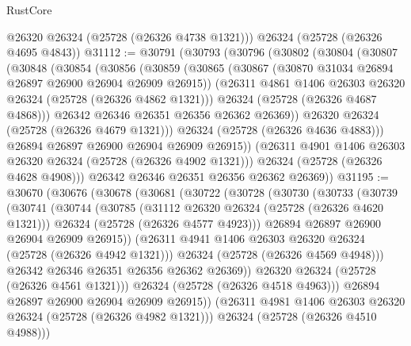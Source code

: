 \begin{lexlean}{RustCore}
\begin{coremodule}
      @26320
      @26324
      (@25728 (@26326 @4738 @1321)))
    @26324
    (@25728 (@26326 @4695 @4843))
@31112 := @30791
    (@30793
      (@30796
        (@30802
          (@30804
            (@30807
              (@30848
                (@30854
                  (@30856
                    (@30859
                      (@30865
                        (@30867 (@30870 @31034 @26894 @26897 @26900 @26904 @26909 @26915))
                        (@26311 @4861 @1406 @26303 @26320 @26324 (@25728 (@26326 @4862 @1321)))
                        @26324
                        (@25728 (@26326 @4687 @4868)))
                      @26342
                      @26346
                      @26351
                      @26356
                      @26362
                      @26369))
                  @26320
                  @26324
                  (@25728 (@26326 @4679 @1321)))
                @26324
                (@25728 (@26326 @4636 @4883)))
              @26894
              @26897
              @26900
              @26904
              @26909
              @26915))
          (@26311 @4901 @1406 @26303 @26320 @26324 (@25728 (@26326 @4902 @1321)))
          @26324
          (@25728 (@26326 @4628 @4908)))
        @26342
        @26346
        @26351
        @26356
        @26362
        @26369))
@31195 := @30670
    (@30676
      (@30678
        (@30681
          (@30722
            (@30728
              (@30730
                (@30733
                  (@30739
                    (@30741
                      (@30744
                        (@30785
                          (@31112 @26320 @26324 (@25728 (@26326 @4620 @1321)))
                          @26324
                          (@25728 (@26326 @4577 @4923)))
                        @26894
                        @26897
                        @26900
                        @26904
                        @26909
                        @26915))
                    (@26311 @4941 @1406 @26303 @26320 @26324 (@25728 (@26326 @4942 @1321)))
                    @26324
                    (@25728 (@26326 @4569 @4948)))
                  @26342
                  @26346
                  @26351
                  @26356
                  @26362
                  @26369))
              @26320
              @26324
              (@25728 (@26326 @4561 @1321)))
            @26324
            (@25728 (@26326 @4518 @4963)))
          @26894
          @26897
          @26900
          @26904
          @26909
          @26915))
      (@26311 @4981 @1406 @26303 @26320 @26324 (@25728 (@26326 @4982 @1321)))
      @26324
      (@25728 (@26326 @4510 @4988)))

\end{coremodule}
\end{lexlean}
